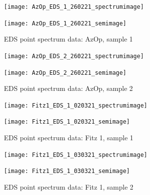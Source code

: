 \begin{figure}[H]
\centering
\begin{minipage}{.45\textwidth}
  \centering
  \texttt{[image: AzOp\_EDS\_1\_260221\_spectrumimage]}
\end{minipage}
\begin{minipage}{.45\textwidth}
  \centering
  \texttt{[image: AzOp\_EDS\_1\_260221\_semimage]}
\end{minipage}
\caption[EDS point spectrum data: AzOp, sample 1]{EDS point spectrum data: AzOp, sample 1}
\label{fig:azop_point_eds_1}
\end{figure}

\begin{figure}[H]
\centering
\begin{minipage}{.45\textwidth}
  \centering
  \texttt{[image: AzOp\_EDS\_2\_260221\_spectrumimage]}
\end{minipage}
\begin{minipage}{.45\textwidth}
  \centering
  \texttt{[image: AzOp\_EDS\_2\_260221\_semimage]}
\end{minipage}
\caption[EDS point spectrum data: AzOp, sample 2]{EDS point spectrum data: AzOp, sample 2}
\label{fig:azop_point_eds_2}
\end{figure}



\begin{figure}[H]
\centering
\begin{minipage}{.45\textwidth}
  \centering
  \texttt{[image: Fitz1\_EDS\_1\_020321\_spectrumimage]}
\end{minipage}
\begin{minipage}{.45\textwidth}
  \centering
  \texttt{[image: Fitz1\_EDS\_1\_020321\_semimage]}
\end{minipage}
\caption[EDS point spectrum data: Fitz 1, sample 1]{EDS point spectrum data: Fitz 1, sample 1}
\label{fig:fitz1_point_eds_1}
\end{figure}

\begin{figure}[H]
\centering
\begin{minipage}{.45\textwidth}
  \centering
  \texttt{[image: Fitz1\_EDS\_1\_030321\_spectrumimage]}
\end{minipage}
\begin{minipage}{.45\textwidth}
  \centering
  \texttt{[image: Fitz1\_EDS\_1\_030321\_semimage]}
\end{minipage}
\caption[EDS point spectrum data: Fitz 1, sample 2]{EDS point spectrum data: Fitz 1, sample 2}
\label{fig:fitz1_point_eds_2}
\end{figure}

